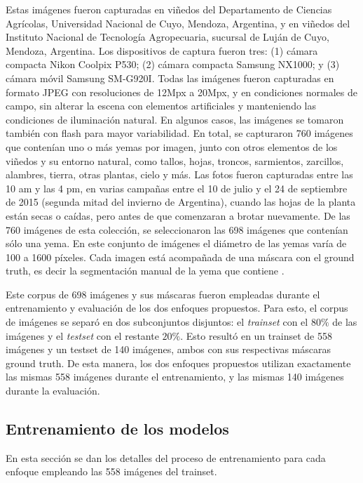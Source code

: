 \documentclass[a4paper,authoryear,review]{elsarticle}
\begin{document}
Estas imágenes fueron capturadas en viñedos del Departamento de Ciencias Agrícolas, Universidad Nacional de Cuyo, Mendoza, Argentina, y en viñedos del Instituto Nacional de Tecnología Agropecuaria, sucursal de Luján de Cuyo, Mendoza, Argentina. Los dispositivos de captura fueron tres: (1) cámara compacta Nikon Coolpix P530; (2) cámara compacta Samsung NX1000; y (3) cámara móvil Samsung SM-G920I. Todas las imágenes fueron capturadas en formato JPEG con resoluciones  de 12Mpx a 20Mpx, y en condiciones normales de campo, sin alterar la escena con elementos artificiales y manteniendo las condiciones de iluminación natural. En algunos casos, las imágenes se tomaron también con flash para mayor variabilidad. En total, se capturaron 760 imágenes que contenían uno o más yemas por imagen, junto con otros elementos de los viñedos y su entorno natural, como tallos, hojas, troncos, sarmientos, zarcillos, alambres, tierra, otras plantas, cielo y más. Las fotos fueron capturadas entre las 10 am y las 4 pm, en varias campañas entre el 10 de julio y el 24 de septiembre de 2015 (segunda mitad del invierno de Argentina), cuando las hojas de la planta están secas o caídas, pero antes de que comenzaran a brotar nuevamente. De las 760 imágenes de esta colección, se seleccionaron las 698 imágenes que contenían sólo una yema. En este conjunto de imágenes el diámetro de las yemas varía de 100 a 1600 píxeles. Cada imagen está acompañada de una máscara con el ground truth, es decir la segmentación manual de la yema que contiene . 

Este corpus de 698 imágenes y sus máscaras fueron empleadas durante el entrenamiento y evaluación de los dos enfoques propuestos. Para esto, el corpus de imágenes se separó en dos subconjuntos disjuntos: el \emph{trainset} con el $80\%$ de las imágenes y el \emph{testset} con el restante $20\%$. Esto resultó en un trainset de 558 imágenes y un testset de 140 imágenes, ambos con sus respectivas máscaras ground truth. De esta manera, los dos enfoques propuestos utilizan exactamente las mismas 558 imágenes durante el entrenamiento, y las mismas 140 imágenes durante la evaluación.

\subsection{Entrenamiento de los modelos} 

En esta sección se dan los detalles del proceso de entrenamiento para cada enfoque empleando las 558 imágenes del trainset.
\end{document}
